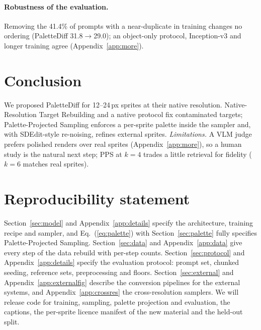 \documentclass{article} %
\newcommand{\ours}{PaletteDiff}
\begin{document}
\paragraph{Robustness of the evaluation.}
Removing the 41.4\% of prompts with a near-duplicate in training changes no ordering (\ours{} 31.8$\to$29.0); an
object-only protocol, Inception-v3 and longer training agree (Appendix~\ref{app:more}).

\section{Conclusion}
\label{sec:conclusion}

We proposed \ours{} for 12--24\,px sprites at their native resolution. Native-Resolution Target Rebuilding and a
native protocol fix contaminated targets; Palette-Projected Sampling enforces a per-sprite palette inside the sampler
and, with SDEdit-style re-noising, refines external sprites.
\emph{Limitations.} A VLM judge prefers polished renders over real sprites
(Appendix~\ref{app:more}), so a human study is the natural next step; PPS at $k=4$ trades a little retrieval for
fidelity ($k=6$ matches real sprites).

\section*{Reproducibility statement}
Section~\ref{sec:model} and Appendix~\ref{app:details} specify the architecture, training recipe and sampler, and
Eq.~(\ref{eq:palette}) with Section~\ref{sec:palette} fully specifies Palette-Projected Sampling. Section~\ref{sec:data}
and Appendix~\ref{app:data} give every step of the data rebuild with per-step counts. Section~\ref{sec:protocol} and
Appendix~\ref{app:details} specify the evaluation protocol: prompt set, chunked seeding, reference sets, preprocessing
and floors. Section~\ref{sec:external} and Appendix~\ref{app:externalfig} describe the conversion pipelines for the
external systems, and Appendix~\ref{app:crossres} the cross-resolution samplers. We will release code for
training, sampling, palette projection and evaluation, the captions, the per-sprite licence manifest of the new
material and the held-out split.
\end{document}
